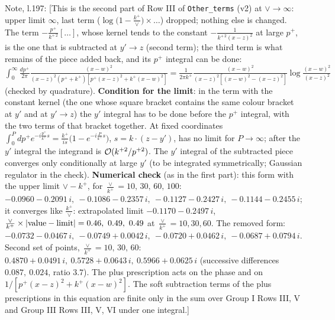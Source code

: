 \documentclass[10pt]{article}
\newenvironment{notebox}{\def\FrameCommand{{\color{notebar}\vrule width 1.5pt}\hspace{6pt}}\MakeFramed{\advance\hsize-\width\FrameRestore}\small}{\endMakeFramed}
\begin{document}
\begin{notebox}\textsf{\small Note, l.197:} [This is the second part of Row III of \texttt{Other\_terms} (v2) at $\vee\to\infty$: upper limit $\infty$, last term ($\log\big(1-\frac{k^{+}}{\vee}\big)\times\dots$) dropped; nothing else is changed. The term $-\frac{p^{+}}{k^{+\,2}}[\dots]$, whose kernel tends to the constant $-\frac{1}{k^{+\,2}(x-z)^{2}}$ at large $p^{+}$, is the one that is subtracted at $y'\to z$ (second term); the third term is what remains of the piece added back, and its $p^{+}$ integral can be done: $\int_{0}^{\infty}\frac{dp^{+}}{2\pi}\frac{(x-w)^{2}}{(x-z)^{2}(p^{+}+k^{+})[p^{+}(x-z)^{2}+k^{+}(x-w)^{2}]}=\frac{1}{2\pi k^{+}}\frac{(x-w)^{2}}{(x-z)^{2}[(x-w)^{2}-(x-z)^{2}]}\log\frac{(x-w)^{2}}{(x-z)^{2}}$ (checked by quadrature). \textbf{Condition for the limit}: in the term with the constant kernel (the one whose square bracket contains the same colour bracket at $y'$ and at $y'\to z$) the $y'$ integral has to be done before the $p^{+}$ integral, with the two terms of that bracket together. At fixed coordinates $\int_{0}^{P}dp^{+}e^{-i\frac{p^{+}}{k^{+}}s}=\frac{k^{+}}{is}\big(1-e^{-i\frac{P}{k^{+}}s}\big)$, $s=k\cdot(z-y')$, has no limit for $P\to\infty$; after the $y'$ integral the integrand is ${\cal O}(k^{+2}/p^{+2})$. The $y'$ integral of the subtracted piece converges only conditionally at large $y'$ (to be integrated symmetrically; Gaussian regulator in the check). \textbf{Numerical check} (as in the first part): this form with the upper limit $\vee-k^{+}$, for $\frac{\vee}{k^{+}}=10,\,30,\,60,\,100$: $-0.0960-0.2091\,i,\ -0.1086-0.2357\,i,\ -0.1127-0.2427\,i,\ -0.1144-0.2455\,i$; it converges like $\frac{k^{+}}{\vee}$: extrapolated limit $-0.1170-0.2497\,i$, $\frac{\vee}{k^{+}}\times|{\rm value}-{\rm limit}|=0.46,\ 0.49,\ 0.49$ at $\frac{\vee}{k^{+}}=10,30,60$. The removed form: $-0.0732-0.0467\,i,\ -0.0749+0.0042\,i,\ -0.0720+0.0462\,i,\ -0.0687+0.0794\,i$. Second set of points, $\frac{\vee}{k^{+}}=10,\,30,\,60$: $0.4870+0.0491\,i,\ 0.5728+0.0643\,i,\ 0.5966+0.0625\,i$ (successive differences $0.087,\ 0.024$, ratio $3.7$). The plus prescription acts on the phase and on $1/[p^{+}(x-z)^{2}+k^{+}(x-w)^{2}]$. The soft subtraction terms of the plus prescriptions in this equation are finite only in the sum over Group I Rows III, V and Group III Rows III, V, VI under one integral.]\end{notebox}
\noindent{\small\textsf{Unmarked edit, l.194 (deleted):} \texttt{U\^{}\{d'b\}\allowbreak{}(z)\allowbreak{}\textbackslash{}\allowbreak{},\allowbreak{}U\^{}\{c'e'\}\allowbreak{}(x')\allowbreak{}\textbackslash{}\allowbreak{},\allowbreak{}\textbackslash{}\allowbreak{}rho\^{}\{e'\}\allowbreak{}(x')\allowbreak{}\textbackslash{}\allowbreak{}right]\textbackslash{}\allowbreak{}times}}\par
\end{document}
